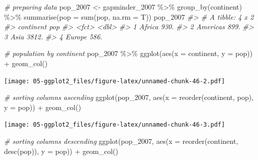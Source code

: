 \documentclass[
]{book}
\newenvironment{Shaded}{\begin{snugshade}}{\end{snugshade}}
\newcommand{\AttributeTok}[1]{\textcolor[rgb]{0.77,0.63,0.00}{#1}}
\newcommand{\CommentTok}[1]{\textcolor[rgb]{0.56,0.35,0.01}{\textit{#1}}}
\newcommand{\FunctionTok}[1]{\textcolor[rgb]{0.00,0.00,0.00}{#1}}
\newcommand{\NormalTok}[1]{#1}
\newcommand{\OtherTok}[1]{\textcolor[rgb]{0.56,0.35,0.01}{#1}}
\newcommand{\SpecialCharTok}[1]{\textcolor[rgb]{0.00,0.00,0.00}{#1}}
\begin{document}
\begin{Shaded}
\begin{Highlighting}[]


\CommentTok{\# preparing data}
\NormalTok{pop\_2007 }\OtherTok{\textless{}{-}} 
\NormalTok{gapminder\_2007 }\SpecialCharTok{\%\textgreater{}\%}
\FunctionTok{group\_by}\NormalTok{(continent) }\SpecialCharTok{\%\textgreater{}\%}
\FunctionTok{summarise}\NormalTok{(}\AttributeTok{pop =} \FunctionTok{sum}\NormalTok{(pop, }\AttributeTok{na.rm =}\NormalTok{ T))}
\NormalTok{pop\_2007}
\CommentTok{\#\textgreater{} \# A tibble: 4 x 2}
\CommentTok{\#\textgreater{}   continent   pop}
\CommentTok{\#\textgreater{}   \textless{}fct\textgreater{}     \textless{}dbl\textgreater{}}
\CommentTok{\#\textgreater{} 1 Africa     930.}
\CommentTok{\#\textgreater{} 2 Americas   899.}
\CommentTok{\#\textgreater{} 3 Asia      3812.}
\CommentTok{\#\textgreater{} 4 Europe     586.}

\CommentTok{\# population by continent}
\NormalTok{pop\_2007 }\SpecialCharTok{\%\textgreater{}\%}
\FunctionTok{ggplot}\NormalTok{(}\FunctionTok{aes}\NormalTok{(}\AttributeTok{x =}\NormalTok{ continent, }\AttributeTok{y =}\NormalTok{ pop)) }\SpecialCharTok{+} 
   \FunctionTok{geom\_col}\NormalTok{()}
\end{Highlighting}
\end{Shaded}

\texttt{[image: 05-ggplot2\_files/figure-latex/unnamed-chunk-46-2.pdf]}

\begin{Shaded}
\begin{Highlighting}[]


\CommentTok{\# sorting columns ascending}
\FunctionTok{ggplot}\NormalTok{(pop\_2007, }\FunctionTok{aes}\NormalTok{(}\AttributeTok{x =} \FunctionTok{reorder}\NormalTok{(continent, pop), }\AttributeTok{y =}\NormalTok{ pop)) }\SpecialCharTok{+} 
   \FunctionTok{geom\_col}\NormalTok{()}
\end{Highlighting}
\end{Shaded}

\texttt{[image: 05-ggplot2\_files/figure-latex/unnamed-chunk-46-3.pdf]}

\begin{Shaded}
\begin{Highlighting}[]
\CommentTok{\# sorting columns descending}
\FunctionTok{ggplot}\NormalTok{(pop\_2007, }\FunctionTok{aes}\NormalTok{(}\AttributeTok{x =} \FunctionTok{reorder}\NormalTok{(continent, }\FunctionTok{desc}\NormalTok{(pop)), }\AttributeTok{y =}\NormalTok{ pop)) }\SpecialCharTok{+} 
   \FunctionTok{geom\_col}\NormalTok{()}
\end{Highlighting}
\end{Shaded}
\end{document}

